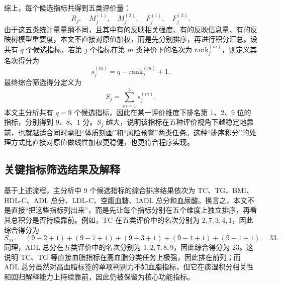 \documentclass{MathorCupmodeling}
\begin{document}
		综上，每个候选指标共得到五类评价量：
		\begin{equation}
			R_j,\quad M_j^{(1)},\quad M_j^{(2)},\quad F_j^{(1)},\quad F_j^{(2)}.
		\end{equation}
		由于这五类统计量量纲不同，且其中有的反映相关强度、有的反映信息量、有的反映树模型重要度，本文不直接对原值加权，而是先分别排序，再进行积分汇总。设共有 $q$ 个候选指标，若第 $j$ 个指标在第 $m$ 类评价下的名次为 $\mathrm{rank}_j^{(m)}$，则定义其名次得分为
		\begin{equation}
			s_j^{(m)}=q-\mathrm{rank}_j^{(m)}+1.
		\end{equation}
		最终综合筛选得分定义为
			\begin{equation}
				S_j=\sum_{m=1}^{5}s_j^{(m)}.
			\end{equation}
			本文主分析共有 $q=9$ 个候选指标，因此在某一评价维度下排名第 $1$、$2$、$9$ 位的指标，分别得到 $9$、$8$、$1$ 分。$S_j$ 越大，说明该指标在五种评价视角下越稳定地靠前，也就越适合同时承担“体质刻画”和“风险预警”两类任务。这种“排序积分”的处理方式比直接对原值做线性加权更稳健，也更符合程序实现。
		
			\subsection{关键指标筛选结果及解释}
				基于上述流程，主分析中 9 个候选指标的综合排序结果依次为 TC、TG、BMI、HDL-C、ADL 总分、LDL-C、空腹血糖、IADL 总分和血尿酸。换言之，本文不是直接“把这些指标列出来”，而是先让每个指标分别在五个维度上独立排序，再看其总积分是否持续靠前。例如，TC 在五类评价中的名次分别为 $2,7,3,4,1$，因此综合得分为
				\begin{equation}
					S_{\text{TC}}=(9-2+1)+(9-7+1)+(9-3+1)+(9-4+1)+(9-1+1)=33.
				\end{equation}
				同理，ADL 总分在五类评价中的名次分别为 $1,2,7,8,9$，因此综合得分为 $23$。这说明 TC、TG 等直接血脂指标在高血脂分类任务上极强，因此排在前列；而 ADL 总分虽然对高血脂标签的单项判别力不如血脂指标，但它在痰湿积分相关性和回归解释能力上持续靠前，因此仍被保留为核心功能指标。
				
\end{document}

